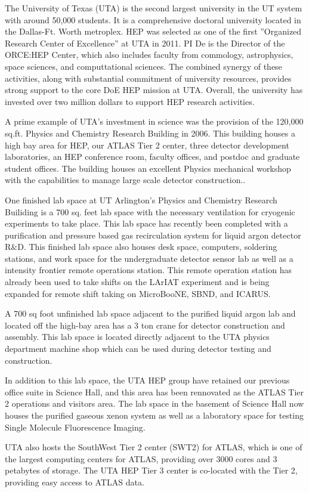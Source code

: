 
The University of Texas (UTA) is the second largest university in the UT system with around 50,000 students. It is a comprehensive doctoral university located in the Dallas-Ft. Worth metroplex. HEP was selected as one of the first ''Organized Research Center of Excellence'' at UTA in 2011. PI De is the Director of the ORCE:HEP Center, which also includes faculty from commology, astrophysics, space sciences, and computtational sciences. The combined synergy of these activities, along with substantial commitment of university resources, provides strong support to the core DoE HEP mission at UTA. Overall, the university has invested over two million dollars to support HEP research activities.

A prime example of UTA's investment in science was the provision of the 120,000 sq.ft. Physics and Chemistry Research Building in 2006.  This building houses a high bay area for HEP, our ATLAS Tier 2 center, three detector development laboratories, an HEP conference room, faculty offices, and postdoc and graduate student offices. The building houses an excellent Physics mechanical workshop with the capabilities to manage large scale detector construction..

One finished lab space at UT Arlington's Physics and Chemistry Research Builiding is a 700 sq. feet lab space with the necessary ventilation for cryogenic experiments to take place. This lab space has recently been completed with a purification and pressure based gas recirculation system for liquid argon detector R$\&$D. This finished lab space also houses desk space, computers, soldering stations, and work space for the undergraduate detector sensor lab as well as a intensity frontier remote operations station. This remote operation station has already been used to take shifts on the LArIAT experiment and is being expanded for remote shift taking on MicroBooNE, SBND, and ICARUS. 

A 700 sq foot unfinished lab space adjacent to the purified liquid argon lab and located off the high-bay area has a 3 ton crane for detector construction and assembly. This lab space is located directly adjacent to the UTA physics department machine shop which can be used during detector testing and construction.

In addition to this lab space, the UTA HEP group have retained our previous office suite in Science Hall, and this area has been rennovated as the ATLAS Tier 2 operations and visitors area. The lab space in the basement of Science Hall now houses the purified gaseous xenon system as well as a laboratory space for testing Single Molecule Fluorescence Imaging.

UTA also hosts the SouthWest Tier 2 center (SWT2) for ATLAS, which is one of the largest computing centers for ATLAS, providing over 3000 cores and 3 petabytes of storage. The UTA HEP Tier 3 center is co-located with the Tier 2, providing easy access to ATLAS data.
